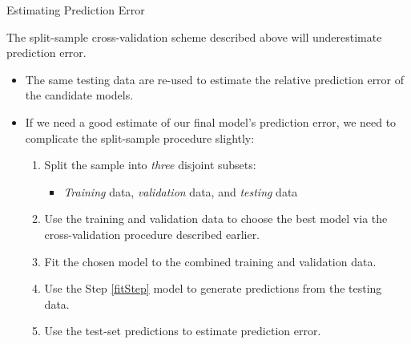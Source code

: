 \documentclass{beamer}\usepackage[]{graphicx}\usepackage[]{color}
\begin{document}
\begin{frame}{Estimating Prediction Error}
  
  The split-sample cross-validation scheme described above will underestimate 
  prediction error.
  \vc
  \begin{itemize}
  \item The same testing data are re-used to estimate the relative prediction 
    error of the candidate models.
    \vc
  \item If we need a good estimate of our final model's prediction error, we 
    need to complicate the split-sample procedure slightly:
    \pause
    \vc
    \begin{enumerate}
    \item Split the sample into \emph{three} disjoint subsets:
      \begin{itemize}
      \item \emph{Training} data, \emph{validation} data, and \emph{testing} 
        data
      \end{itemize}
      \vc
    \item Use the training and validation data to choose the best model via the 
      cross-validation procedure described earlier.
      \vc
    \item Fit the chosen model to the combined training and validation data. 
      \label{fitStep}
      \vc
    \item Use the Step \ref{fitStep} model to generate predictions from the 
      testing data.
      \vc
    \item Use the test-set predictions to estimate prediction error.
    \end{enumerate}
  \end{itemize}
  
\end{frame}
  
\watermarkoff %
\end{document}
